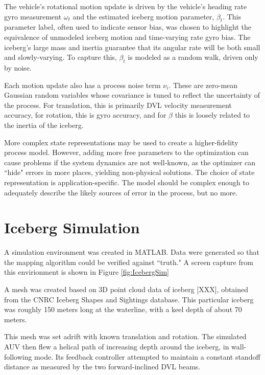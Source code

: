 The vehicle's rotational motion update is driven by the vehicle's heading rate gyro measurement $\omega_t$ and the estimated iceberg motion parameter, $\beta_t$. This parameter label, often used to indicate sensor bias, was chosen to highlight the equivalence of unmodeled iceberg motion and time-varying rate gyro bias. The iceberg's large mass and inertia guarantee that its angular rate will be both small and slowly-varying. To capture this, $\beta_t$ is modeled as a random walk, driven only by noise.

Each motion update also has a process noise term $\nu_i$. These are zero-mean Gaussian random variables whose covariance is tuned to reflect the uncertainty of the process. For translation, this is primarily DVL velocity measurement accuracy, for rotation, this is gyro accuracy, and for $\beta$ this is loosely related to the inertia of the iceberg. 

More complex state representations may be used to create a higher-fidelity process model. However, adding more free parameters to the optimization can cause problems if the system dynamics are not well-known, as the optimizer can ``hide" errors in more places, yielding non-physical solutions. The choice of state representation is application-specific. The model should be complex enough to adequately describe the likely sources of error in the process, but no more.


\section{Iceberg Simulation}

A simulation environment was created in MATLAB. Data were generated so that the mapping algorithm could be verified against ``truth." A screen capture from this envirionment is shown in Figure \ref{fig:IcebergSim}

A mesh was created based on 3D point cloud data of iceberg [XXX], obtained from the CNRC Iceberg Shapes and Sightings database. \cite{?} This particular iceberg was roughly 150 meters long at the waterline, with a keel depth of about 70 meters.

This mesh was set adrift with known translation and rotation. The simulated AUV then flew a helical path of increasing depth around the iceberg, in wall-following mode. Its feedback controller attempted to maintain a constant standoff distance as measured by the two forward-inclined DVL beams.

